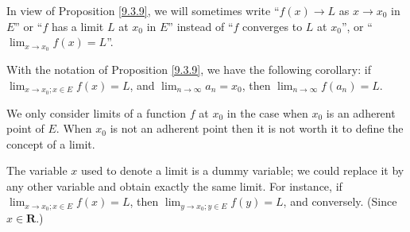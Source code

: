 \begin{note}
    In view of Proposition \ref{9.3.9}, we will sometimes write ``\(f(x) \to L\) as \(x \to x_0\) in \(E\)'' or ``\(f\) has a limit \(L\) at \(x_0\) in \(E\)'' instead of ``\(f\) converges to \(L\) at \(x_0\)'', or ``\(\lim_{x \to x_0} f(x) = L\)''.
\end{note}

\begin{remark}\label{9.3.10}
    With the notation of Proposition \ref{9.3.9}, we have the following corollary:
    if \(\lim_{x \to x_0 ; x \in E} f(x) = L\), and \(\lim_{n \to \infty} a_n = x_0\), then \(\lim_{n \to \infty} f(a_n) = L\).
\end{remark}

\begin{remark}\label{9.3.11}
    We only consider limits of a function \(f\) at \(x_0\) in the case when \(x_0\) is an adherent point of \(E\).
    When \(x_0\) is not an adherent point then it is not worth it to define the concept of a limit.
\end{remark}

\begin{remark}\label{9.3.12}
    The variable \(x\) used to denote a limit is a dummy variable;
    we could replace it by any other variable and obtain exactly the same limit.
    For instance, if \(\lim_{x \to x_0 ; x \in E} f(x) = L\), then \(\lim_{y \to x_0 ; y \in E} f(y) = L\), and conversely.
    (Since \(x \in \mathbf{R}\).)
\end{remark}